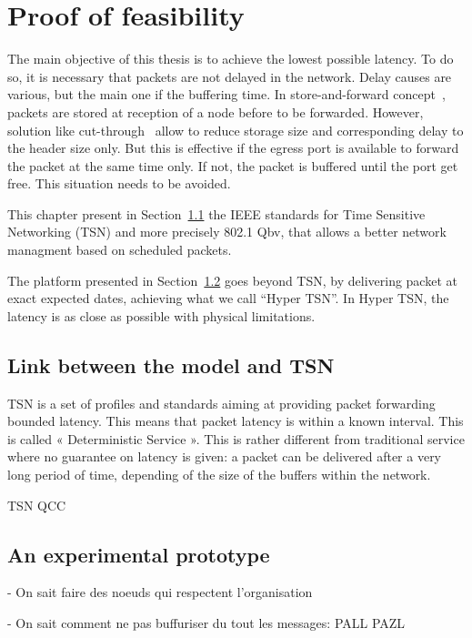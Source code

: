 
\chapter{Proof of feasibility}
\label{chap:TSN}
\minitoc
The main objective of this thesis is to achieve the lowest possible latency. To do so, it is necessary that packets are not delayed in the network. Delay causes are various, but the main one if the buffering time. In store-and-forward concept~\cite{tindell1992store}, packets are stored at reception of a node before to be forwarded. However, solution like cut-through~\cite{kermani1979virtual} allow to reduce storage size and corresponding delay to the header size only. But this is effective if the egress port is available to forward the packet at the same time only. If not, the packet is buffered until the port get free. This situation needs to be avoided.

This chapter present in Section~\ref{sec:TSNqbv} the IEEE standards for Time Sensitive Networking (TSN) and more precisely 802.1 Qbv, that allows a better network managment based on scheduled packets. 

The platform presented in Section~\ref{sec:platform} goes beyond TSN, by delivering packet at exact expected dates, achieving what we call “Hyper TSN”. In Hyper TSN, the latency is as close as possible with physical limitations.


\section{Link between the model and TSN}
\label{sec:TSNqbv}
 TSN is a set of profiles and standards aiming at providing packet forwarding bounded latency. This means that packet latency is within a known interval. This is called « Deterministic Service ». This is rather different from traditional service where no guarantee on latency is given: a packet can be delivered after a very long period of time, depending of the size of the buffers within the network.

 TSN QCC
\section{An experimental prototype}
\label{sec:platform}
- On sait faire des noeuds qui respectent l'organisation

- On sait comment ne pas buffuriser du tout les messages: PALL PAZL

